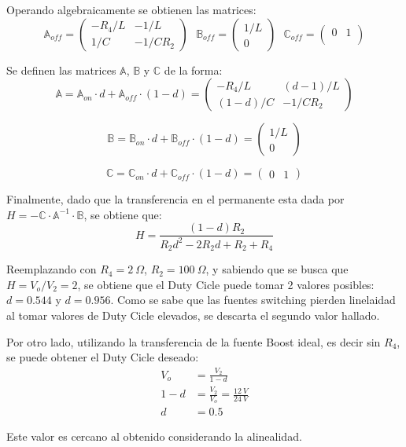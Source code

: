 Operando algebraicamente se obtienen las matrices: 
\begin{equation}
\mathbb{A}_{off} =  \begin{pmatrix}
	-R_4/L & -1/L \\
	1/C & -1/ C R_2
\end{pmatrix} \ \ \
\mathbb{B}_{off} =  \begin{pmatrix}
	1/L \\
	0
\end{pmatrix} \ \ \
\mathbb{C}_{off} =  \begin{pmatrix}
	0 & 1 \\
\end{pmatrix}
\end{equation}

Se definen las matrices $\mathbb{A}$, $\mathbb{B}$ y $\mathbb{C}$ de la forma:
\begin{equation}
\mathbb{A} = \mathbb{A}_{on} \cdot d + \mathbb{A}_{off} \cdot (1-d) =  \begin{pmatrix}
	-R_4/L & (d-1)/L \\
	(1-d)/C & -1/ C R_2
\end{pmatrix}
\end{equation}

\begin{equation}
\mathbb{B} = \mathbb{B}_{on} \cdot d + \mathbb{B}_{off} \cdot (1-d) = \begin{pmatrix}
	1/L \\
	0
\end{pmatrix}
\end{equation}

\begin{equation}
\mathbb{C} = \mathbb{C}_{on} \cdot d + \mathbb{C}_{off} \cdot (1-d) = \begin{pmatrix}
	0 & 1
\end{pmatrix}
\end{equation}

Finalmente, dado que la transferencia en el permanente esta dada por $H = -\mathbb{C} \cdot \mathbb{A}^{-1} \cdot \mathbb{B}$, se obtiene que:
\begin{equation}
H = \frac{\left( 1 - d \right) R_2}{R_2 d^2 - 2 R_2 d + R_2 + R_4}
\end{equation}

Reemplazando con $R_4 = 2 \ \Omega$, $R_2 = 100 \ \Omega$, y sabiendo que se busca que $H = V_o / V_2 = 2$, se obtiene que el Duty Cicle puede tomar 2 valores posibles: $d = 0.544$ y $d = 0.956$. Como se sabe que las fuentes switching pierden linelaidad al tomar valores de Duty Cicle elevados, se descarta el segundo valor hallado.

Por otro lado, utilizando la transferencia de la fuente Boost ideal, es decir sin $R_4$, se puede obtener el Duty Cicle deseado:
\begin{align*}
V_o &= \frac{V_2}{1 - d}	\\
1 - d &= \frac{V_2}{V_o} = \frac{12 \ V}{24 \ V} \\
d &= 0.5
\end{align*}

Este valor es cercano al obtenido considerando la alinealidad.
\note{Falta ver el real obtenido.}

